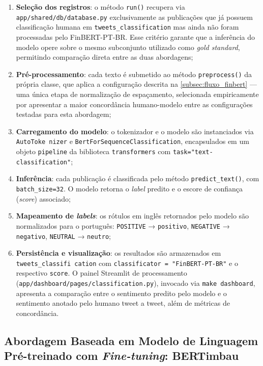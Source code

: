\begin{enumerate}
	\item \textbf{Seleção dos registros}: o método \texttt{run()} recupera via \texttt{app/shared/db/database.py} exclusivamente as publicações que já possuem classificação humana em \texttt{tweets\_classification} mas ainda não foram processadas pelo FinBERT-PT-BR. Esse critério garante que a inferência do modelo opere sobre o mesmo subconjunto utilizado como \textit{gold standard}, permitindo comparação direta entre as duas abordagens;
	
	\item \textbf{Pré-processamento}: cada texto é submetido ao método \texttt{preprocess()} da própria classe, que aplica a configuração descrita na \autoref{subsec:fluxo_finbert} --- uma única etapa de normalização de espaçamento, selecionada empiricamente por apresentar a maior concordância humano-modelo entre as configurações testadas para esta abordagem;
	
	\item \textbf{Carregamento do modelo}: o tokenizador e o modelo são instanciados via \texttt{AutoToke nizer} e \texttt{BertForSequenceClassification}, encapsulados em um objeto \texttt{pipeline} da biblioteca \texttt{transformers} com \texttt{task="text-classification"};
	
	\item \textbf{Inferência}: cada publicação é classificada pelo método \texttt{predict\_text()}, com \texttt{batch\_size=32}. O modelo retorna o \textit{label} predito e o escore de confiança (\textit{score}) associado;
	
	\item \textbf{Mapeamento de \textit{labels}}: os rótulos em inglês retornados pelo modelo são normalizados para o português: \texttt{POSITIVE} → \texttt{positivo}, 	\texttt{NEGATIVE} → \texttt{negativo}, \texttt{NEUTRAL} → \texttt{neutro};
	
	\item \textbf{Persistência e visualização}: os resultados são armazenados em \texttt{tweets\_classifi cation} com \texttt{classificator = "FinBERT-PT-BR"} e o respectivo 	\texttt{score}. O painel Streamlit de processamento (\texttt{app/dashboard/pages/classification.py}), invocado via \texttt{make dashboard}, apresenta a comparação entre o sentimento predito pelo modelo e o sentimento anotado pelo humano tweet a tweet, além de métricas de concordância.
\end{enumerate}

\subsection{Abordagem Baseada em Modelo de Linguagem Pré-treinado com \textit{Fine-tuning}: BERTimbau}
\label{subsec:bertimbau}

